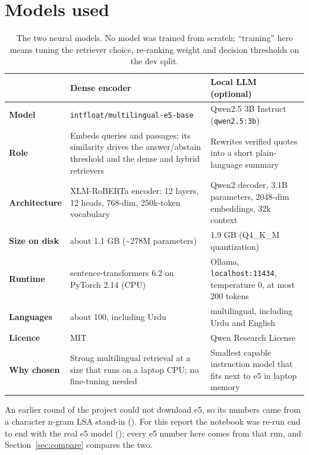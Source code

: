 \documentclass[11pt,a4paper]{article}
\begin{document}
\section{Models used}
\label{sec:models}

\begin{table}[H]
\centering\small
\begin{tabularx}{\textwidth}{@{}>{\bfseries}p{3.0cm} X X@{}}
\toprule
 & Dense encoder & Local LLM (optional)\\
\midrule
Model & \texttt{intfloat/multilingual-e5-base} & Qwen2.5 3B Instruct (\texttt{qwen2.5:3b})\\
Role & Embeds queries and passages; its similarity drives the answer/abstain threshold and the dense and hybrid retrievers & Rewrites verified quotes into a short plain-language summary\\
Architecture & XLM-RoBERTa encoder: 12 layers, 12 heads, 768-dim, 250k-token vocabulary & Qwen2 decoder, 3.1B parameters, 2048-dim embeddings, 32k context\\
Size on disk & about 1.1 GB (\textasciitilde 278M parameters) & 1.9 GB (Q4\_K\_M quantization)\\
Runtime & sentence-transformers 6.2 on PyTorch 2.14 (CPU) & Ollama, \texttt{localhost:11434}, temperature 0, at most 200 tokens\\
Languages & about 100, including Urdu & multilingual, including Urdu and English\\
Licence & MIT & Qwen Research License\\
Why chosen & Strong multilingual retrieval at a size that runs on a laptop CPU; no fine-tuning needed & Smallest capable instruction model that fits next to e5 in laptop memory\\
\bottomrule
\end{tabularx}
\caption{The two neural models. No model was trained from scratch; ``training'' here means tuning the retriever choice,
re-ranking weight and decision thresholds on the dev split.}
\label{tab:models}
\end{table}

\begin{notebox}
An earlier round of the project could not download e5, so its numbers came from a character n-gram LSA stand-in
(\texttt{\StubVersion}). For this report the notebook was re-run end to end with the real e5 model (\texttt{\PipelineVersion});
every e5 number here comes from that run, and Section~\ref{sec:compare} compares the two.
\end{notebox}
\end{document}

